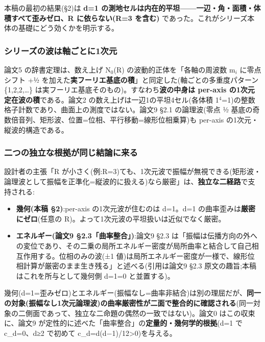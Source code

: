 \documentclass[
]{ltjsarticle}
\providecommand{\tightlist}{%
  \setlength{\itemsep}{0pt}\setlength{\parskip}{0pt}}
\begin{document}
本稿の最初の結果(§2)は \textbf{d=1
の測地セルは内在的平坦------一辺・角・面積・体積すべて歪みゼロ、R
に依らない(R=3 を含む)}
であった。これがシリーズ本体の基礎にどう効くかを明示する。

\subsubsection{シリーズの波は軸ごとに1次元}\label{ux30b7ux30eaux30fcux30baux306eux6ce2ux306fux8ef8ux3054ux3068ux306b1ux6b21ux5143}

論文5 の辞書定理は、数え上げ N\(_{0}\)(R) の波動的正体を「各軸の周波数
m\(_i\) に零点シフト +½
を加えた\textbf{実フーリエ基底の積}」と同定した(軸ごとの多重度パターン
\{1,2,2,\ldots\} は実フーリエ基底そのもの)。すなわち\textbf{波の中身は
per-axis の1次元定在波の積}である。論文2
の数え上げは一辺1の平坦4セル(各体積
1\(^{4}\)=1)の整数格子計数であり、曲面上の測度ではない。論文9 §2.1
の論理波(零点 ½
基底の奇数倍音列、矩形波、位置=位相、平行移動=線形位相乗算)も per-axis
の1次元・縦波的構造である。

\subsubsection{二つの独立な根拠が同じ結論に来る}\label{ux4e8cux3064ux306eux72ecux7acbux306aux6839ux62e0ux304cux540cux3058ux7d50ux8ad6ux306bux6765ux308b}

設計者の主張「R
が小さく(例:R=3)ても、1次元波で振幅が無視できる(矩形波・論理波として振幅を正準化=縦波的に扱える)なら厳密」は、\textbf{独立な二経路}で支持される:

\begin{itemize}
\tightlist
\item
  \textbf{幾何(本稿 §2)}:per-axis の1次元波が住むのは d=1。d=1
  の曲率歪みは\textbf{厳密にゼロ}(任意の
  R)。よって1次元波の平坦扱いは近似でなく厳密。
\item
  \textbf{エネルギー(論文9 §2.3「曲率整合」)}:論文9 §2.3
  は「振幅は伝播方向の外への変位であり、その二乗の局所エネルギー密度が局所曲率と結合して自己相互作用する。位相のみの波(±1
  値)は局所エネルギー密度が一様で、線形位相計算が厳密のまま生き残る」と述べる(引用は論文9
  §2.3 原文の趣旨;本稿はこれを所与として幾何側 d=1=0 と並置する)。
\end{itemize}

幾何(d=1=歪みゼロ)とエネルギー(振幅なし=曲率非結合)は別の理屈だが、\textbf{同一の対象(振幅なし1次元論理波)の曲率厳密性が二面で整合的に確認される}(同一対象の二側面であって、独立な二命題の偶然の一致ではない)。論文0
はこの収束に、論文9
が定性的に述べた「曲率整合」の\textbf{定量的・幾何学的根拠}(d=1 で
c\_d=0、d≥2 で初めて c\_d=d(d−1)/12\textgreater0)を与える。
\end{document}
